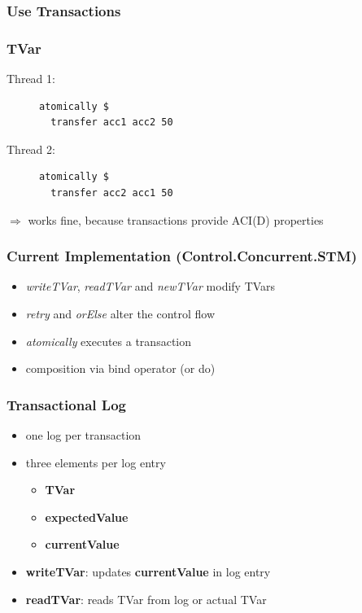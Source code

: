 \documentclass{beamer}
\newcommand{\code}[1]{\textbf{#1}}
\begin{document}
  \begin{frame}
    \frametitle{Use Transactions}
       
  \end{frame}
  
  \begin{frame}[fragile]
    \frametitle{TVar}
    \fboxsep=0pt
    \noindent
    \begin{minipage}[t]{0.48\linewidth}
      Thread 1:
      \begin{figure}
       \begin{lstlisting}[frame=single]
atomically $ 
  transfer acc1 acc2 50
       \end{lstlisting}
      \end{figure}
    \end{minipage}%
    \hfill%
    \begin{minipage}[t]{0.48\linewidth}
      Thread 2:
      \begin{figure}
       \begin{lstlisting}[frame=single]
atomically $ 
  transfer acc2 acc1 50
       \end{lstlisting}
      \end{figure}
    \end{minipage}
    \vfill
    \pause
    $\Rightarrow$ works fine, because transactions provide ACI(D) properties
\end{frame}
  \begin{frame}
    \frametitle{Current Implementation (Control.Concurrent.STM)}
    \begin{itemize}\setlength\itemsep{1em}
      \item \textit{writeTVar}, \textit{readTVar} and \textit{newTVar} modify TVars
      \item \textit{retry} and \textit{orElse} alter the control flow
      \item \textit{atomically} executes a transaction 
      \item composition via bind operator (or do)
    \end{itemize}
  \end{frame}
  
  \begin{frame}
   \frametitle{Transactional Log}
   \begin{itemize}\setlength\itemsep{1em}
    \item one log per transaction
    \item three elements per log entry
          \begin{itemize}
           \item \code{TVar}
           \item \code{expectedValue}
           \item \code{currentValue}
          \end{itemize}
    \item \textbf{writeTVar}: updates \code{currentValue} in log entry
    \item \textbf{readTVar}: reads TVar from log or actual TVar
   \end{itemize}
  \end{frame}
  
\end{document}
